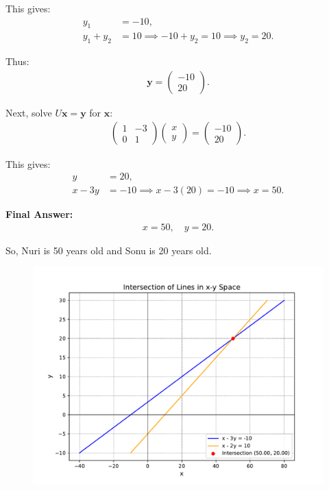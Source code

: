 \documentclass[journal,12pt,onecolumn]{IEEEtran}
\theoremstyle{remark}
\begin{document}
This gives:
\begin{align}
    y_1 &= -10, \\
    y_1 + y_2 &= 10 \implies -10 + y_2 = 10 \implies y_2 = 20.
\end{align}

Thus:
\begin{align}
    \mathbf{y} =
    \begin{pmatrix}
        -10 \\ 20
    \end{pmatrix}.
\end{align}

Next, solve $U \mathbf{x} = \mathbf{y}$ for $\mathbf{x}$:
\begin{align}
    \begin{pmatrix}
        1 & -3 \\
        0 & 1
    \end{pmatrix}
    \begin{pmatrix}
        x \\ y
    \end{pmatrix}
    =
    \begin{pmatrix}
        -10 \\ 20
    \end{pmatrix}.
\end{align}

This gives:
\begin{align}
    y &= 20, \\
    x - 3y &= -10 \implies x - 3(20) = -10 \implies x = 50.
\end{align}

\textbf{Final Answer:}
\begin{align}
    x = 50, \quad y = 20.
\end{align}

So, Nuri is 50 years old and Sonu is 20 years old.

\begin{figure}[h]
	\centering
	\includegraphics[width=\columnwidth]{figs/fig.pdf}
\end{figure}
\end{document}
